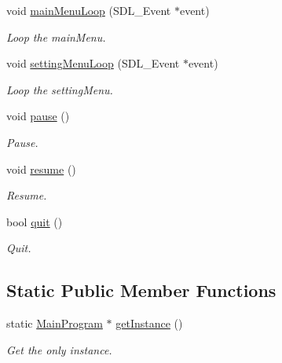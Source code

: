 \begin{DoxyCompactItemize}
\mbox{\label{class_main_program_a7e9052f1ad7f82e62402f10aec96354f}} 
void \mbox{\hyperlink{class_main_program_a7e9052f1ad7f82e62402f10aec96354f}{main\+Menu\+Loop}} (S\+D\+L\+\_\+\+Event $\ast$event)
\begin{DoxyCompactList}\small\item\em Loop the main\+Menu. \end{DoxyCompactList}\item 
\mbox{\label{class_main_program_a5c8c54094f6b841f6586f1916e6a283d}} 
void \mbox{\hyperlink{class_main_program_a5c8c54094f6b841f6586f1916e6a283d}{setting\+Menu\+Loop}} (S\+D\+L\+\_\+\+Event $\ast$event)
\begin{DoxyCompactList}\small\item\em Loop the setting\+Menu. \end{DoxyCompactList}\item 
\mbox{\label{class_main_program_a10adb4fcf973eff62c19130bcbe100ad}} 
void \mbox{\hyperlink{class_main_program_a10adb4fcf973eff62c19130bcbe100ad}{pause}} ()
\begin{DoxyCompactList}\small\item\em Pause. \end{DoxyCompactList}\item 
\mbox{\label{class_main_program_a275f5768a54b0972a00bdc1ba8aa92a6}} 
void \mbox{\hyperlink{class_main_program_a275f5768a54b0972a00bdc1ba8aa92a6}{resume}} ()
\begin{DoxyCompactList}\small\item\em Resume. \end{DoxyCompactList}\item 
\mbox{\label{class_main_program_a2816158bf4844556e4a278293c6065fb}} 
bool \mbox{\hyperlink{class_main_program_a2816158bf4844556e4a278293c6065fb}{quit}} ()
\begin{DoxyCompactList}\small\item\em Quit. \end{DoxyCompactList}\end{DoxyCompactItemize}
\subsection*{Static Public Member Functions}
\begin{DoxyCompactItemize}
\item 
\mbox{\label{class_main_program_ad5f485444a67870da12ee3c2fe543dfa}} 
static \mbox{\hyperlink{class_main_program}{Main\+Program}} $\ast$ \mbox{\hyperlink{class_main_program_ad5f485444a67870da12ee3c2fe543dfa}{get\+Instance}} ()
\begin{DoxyCompactList}\small\item\em Get the only instance. \end{DoxyCompactList}\end{DoxyCompactItemize}
